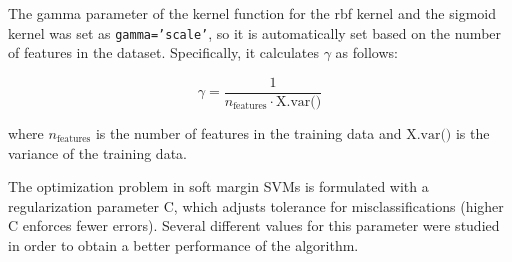 The gamma parameter of the kernel function for the rbf kernel and the sigmoid kernel was set as \texttt{gamma='scale'}, so it is automatically set based on the number of features in the dataset. Specifically, it calculates $\gamma$ as follows:

$$
\gamma = \frac{1}{n_{\text{features}} \cdot \text{X.var()}}
$$

where $n_{\text{features}}$ is the number of features in the training data and $\text{X.var()}$ is the variance of the training data.
\newline 

The optimization problem in soft margin SVMs is formulated with a regularization parameter C, which adjusts tolerance for misclassifications (higher C enforces fewer errors). Several different values for this parameter were studied in order to obtain a better performance of the algorithm.
